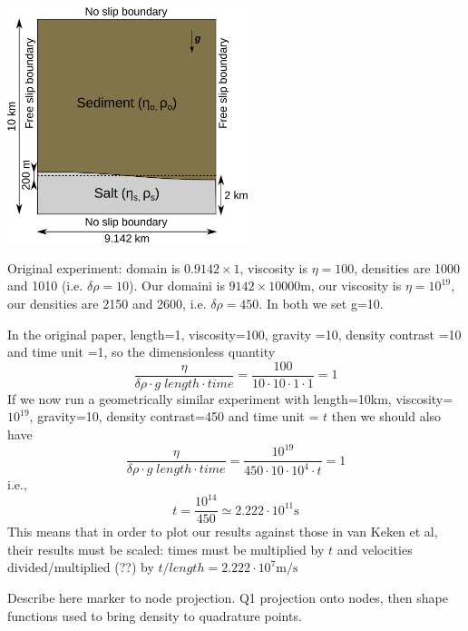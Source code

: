 
\begin{center}
\includegraphics[width=7cm]{python_codes/fieldstone_41/images/setup}
\end{center}

Original experiment: domain is $0.9142\times1$, viscosity is $\eta=100$, 
densities are 1000 and 1010 (i.e. $\delta \rho=10$).
Our domaini is $9142\times10000$m, our viscosity is $\eta=10^{19}$,
our densities are 2150 and 2600, i.e. $\delta\rho = 450$.
In both we set g=10.

In the original paper, 
length=1, viscosity=100, gravity =10, density contrast =10 and time unit =1,
so the dimensionless quantity
\[
\frac{\eta}{\delta\rho \cdot g \; length \cdot time} = \frac{100}{10 \cdot 10 \cdot 1 \cdot 1} =1
\]
If we now run a geometrically similar experiment with 
length=10km, viscosity=$10^{19}$, gravity=10, density contrast=450 and time unit = $t$
then we should also have 
\[
\frac{\eta}{\delta\rho \cdot g \; length \cdot time} = \frac{10^{19}}{450 \cdot 10 \cdot 10^4 \cdot t} =1
\]
i.e.,
\[
t = \frac{10^{14}}{450} \simeq 2.222 \cdot 10^{11}\text{s}
\]
This means that in order to plot our results against those in van Keken et al, their results
must be scaled: times must be multiplied by $t$ and velocities divided/multiplied (??) by 
$t/length = 2.222 \cdot 10^{7}\text{m/s}$  

Describe here marker to node projection. Q1 projection onto nodes, then 
shape functions used to bring density to quadrature points. 


